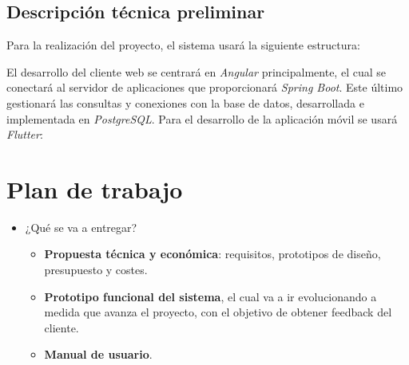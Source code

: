 \documentclass{article}
\begin{document}
\newpage
\subsection{Descripción técnica preliminar}
Para la realización del proyecto, el sistema usará la siguiente estructura: \vspace{0.15cm}

\begin{figure}[H]
\end{figure}
\vspace{0.15cm}

El desarrollo del cliente web se centrará en \textit{Angular} principalmente, el cual se conectará al servidor de aplicaciones que proporcionará \textit{Spring Boot}. Este último gestionará las consultas y conexiones con la base de datos, desarrollada e implementada en \textit{PostgreSQL}.
Para el desarrollo de la aplicación móvil se usará \textit{Flutter}:
\begin{figure}[H]
\end{figure}
\newpage

\section{Plan de trabajo}
\begin{itemize}
	\item ¿Qué se va a entregar?
	\begin{itemize}
		\item \textbf{Propuesta técnica y económica}: requisitos, prototipos de diseño, presupuesto y costes.
		\item \textbf{Prototipo funcional del sistema}, el cual va a ir evolucionando a medida que avanza el proyecto, con el objetivo de obtener feedback del cliente.
		\item \textbf{Manual de usuario}.
	\end{itemize}
\end{itemize}
\end{document}
